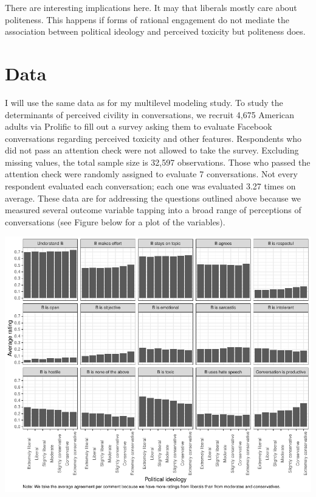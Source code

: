 \documentclass{article}
\begin{document}
There are interesting implications here. It may that liberals mostly care about politeness. This happens if forms of rational engagement do not mediate the association between political ideology and perceived toxicity but politeness does. 



\section{Data}

I will use the same data as for my multilevel modeling study. To study the determinants of perceived civility in conversations, we recruit 4,675 American adults via Prolific to fill out a survey asking them to evaluate Facebook conversations regarding perceived toxicity and other features. Respondents who did not pass an attention check were not allowed to take the survey. Excluding missing values, the total sample size is 32,597 observations. Those who passed the attention check were randomly assigned to evaluate 7 conversations. Not every respondent evaluated each conversation; each one was evaluated 3.27 times on average. These data are for addressing the questions outlined above because we measured several outcome variable tapping into a broad range of perceptions of conversations (see Figure below for a plot of the variables). 

\includegraphics[]{figures/2_AvgAgreement_Ideo.pdf}
\end{document}
